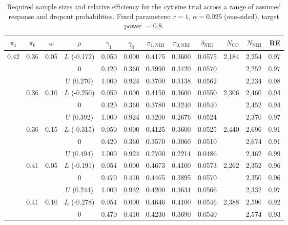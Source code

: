 \begin{table}[htbp]
  \centering
  \footnotesize
  \setlength{\tabcolsep}{3pt}
  \caption{Required sample sizes and relative efficiency for the cytisine trial across a range of assumed response and dropout probabilities. Fixed parameters: $r = 1$, $\alpha = 0.025$ (one-sided), target power $= 0.8$.}
  \label{tab:application-sensitivity}
  \begin{threeparttable}
  \begin{tabular}{cccccccccrrr}
    \toprule
    $\pi_{1}$ & $\pi_{0}$ & $\omega$ & $\rho$ & $\gamma_{1}$ & $\gamma_{0}$ & $\pi_{1,\mathrm{NRI}}$ & $\pi_{0,\mathrm{NRI}}$ & $\delta_{\mathrm{NRI}}$ & $N_{\mathrm{CC}}$ & $N_{\mathrm{NRI}}$ & RE \\
    \midrule
    0.42 & 0.36 & 0.05 & $L$ (-0.172) & 0.050 & 0.000 & 0.4175 & 0.3600 & 0.0575 & 2,184 & 2,254 & 0.97 \\
     &  &  & $0$ & 0.420 & 0.360 & 0.3990 & 0.3420 & 0.0570 &  & 2,252 & 0.97 \\
     &  &  & $U$ (0.270) & 1.000 & 0.924 & 0.3700 & 0.3138 & 0.0562 &  & 2,234 & 0.98 \\
    \addlinespace
    0.42 & 0.36 & 0.10 & $L$ (-0.250) & 0.050 & 0.000 & 0.4150 & 0.3600 & 0.0550 & 2,306 & 2,460 & 0.94 \\
     &  &  & $0$ & 0.420 & 0.360 & 0.3780 & 0.3240 & 0.0540 &  & 2,452 & 0.94 \\
     &  &  & $U$ (0.392) & 1.000 & 0.924 & 0.3200 & 0.2676 & 0.0524 &  & 2,370 & 0.97 \\
    \addlinespace
    0.42 & 0.36 & 0.15 & $L$ (-0.315) & 0.050 & 0.000 & 0.4125 & 0.3600 & 0.0525 & 2,440 & 2,696 & 0.91 \\
     &  &  & $0$ & 0.420 & 0.360 & 0.3570 & 0.3060 & 0.0510 &  & 2,674 & 0.91 \\
     &  &  & $U$ (0.494) & 1.000 & 0.924 & 0.2700 & 0.2214 & 0.0486 &  & 2,462 & 0.99 \\
    \addlinespace
    0.47 & 0.41 & 0.05 & $L$ (-0.191) & 0.054 & 0.000 & 0.4673 & 0.4100 & 0.0573 & 2,262 & 2,352 & 0.96 \\
     &  &  & $0$ & 0.470 & 0.410 & 0.4465 & 0.3895 & 0.0570 &  & 2,350 & 0.96 \\
     &  &  & $U$ (0.244) & 1.000 & 0.932 & 0.4200 & 0.3634 & 0.0566 &  & 2,332 & 0.97 \\
    \addlinespace
    0.47 & 0.41 & 0.10 & $L$ (-0.278) & 0.054 & 0.000 & 0.4646 & 0.4100 & 0.0546 & 2,388 & 2,590 & 0.92 \\
     &  &  & $0$ & 0.470 & 0.410 & 0.4230 & 0.3690 & 0.0540 &  & 2,574 & 0.93 \\

\end{tabular}
\end{threeparttable}
\end{table}
